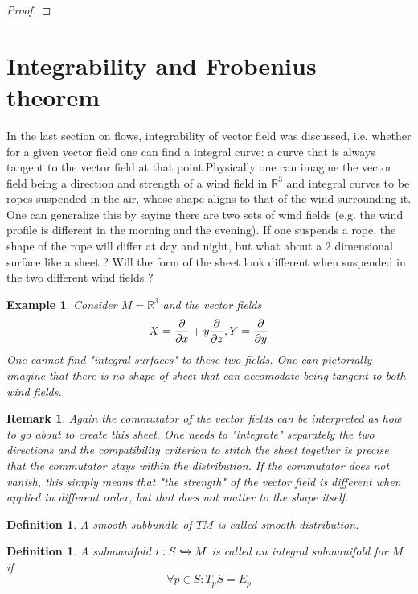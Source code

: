 \documentclass{article}
\numberwithin{theorem}{section}
\newtheorem{definition}[theorem]{Definition}
\newtheorem*{remark}{Remark}
\newtheorem*{example}{Example}
\newcommand{\R}{\mathbb{R}}
\newcommand{\1}{\mathds{1}}
\begin{document}
\begin{proof}
    
\end{proof}
\section{Integrability and Frobenius theorem }
In the last section on flows, integrability of vector field was discussed, i.e. whether for a given vector field one can find a integral curve: a curve that is always tangent to the vector field at that point.Physically one can imagine the vector field being a direction and strength of a wind field in $\R^3$ and integral curves to be ropes suspended in the air, whose shape aligns to that of the wind surrounding it. One can generalize this by saying there are two sets of wind fields (e.g. the wind profile is different in the morning and the evening). If one suspends a rope, the shape of the rope will differ at day and night, but what about a 2 dimensional surface like a sheet ? Will the form of the sheet look different when suspended in the two different wind fields ? 

\begin{example}
    Consider $M = \R^3$ and the vector fields 
    \[ X = \pdv{}{x} + y \pdv{}{z}, Y = \pdv{}{y} \]
    One cannot find "integral surfaces" to these two fields. One can pictorially imagine that there is no shape of sheet that can accomodate being tangent to both wind fields. 
\end{example}

\begin{remark}
    Again the commutator of the vector fields can be interpreted as how to go about to create this sheet. One needs to "integrate" separately the two directions and the compatibility criterion to stitch the sheet together is precise that the commutator stays within the distribution. If the commutator does not vanish, this simply means that "the strength" of the vector field is different when applied in different order, but that does not matter to the shape itself. 
\end{remark}
\begin{definition}
    A smooth subbundle of $TM$ is called smooth distribution. 
\end{definition}
\begin{definition}
    A submanifold $i : S \xhookrightarrow{} M$ is called an integral submanifold for $M$ if 
    \[ \forall  p \in S : T_pS = E_p \]
\end{definition}
\end{document}
